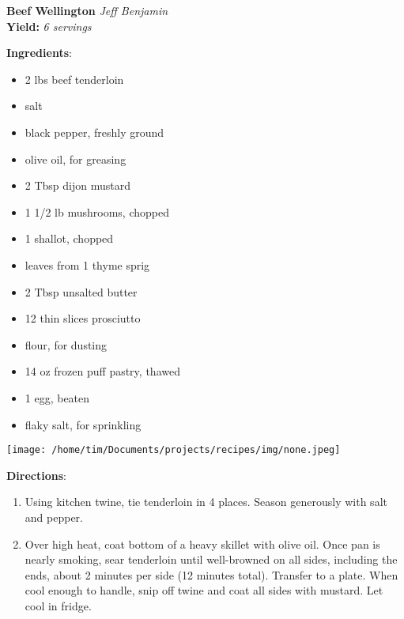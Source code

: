 \documentclass[11pt, twoside, openany]{book}
\begin{document}
\noindent\begin{minipage}[t]{\linewidth}%
{\Large\textbf{Beef Wellington}} \label{beef-wellington}\hfill\textit{Jeff Benjamin}\\
\textbf{Yield:} \textit{6 servings}\\
\noindent\begin{minipage}[t]{0.78\linewidth}%
\textbf{Ingredients}:\vspace{-3mm}
\begin{multicols}{2}
\begin{itemize}\setlength\itemsep{-1mm}
\item 2 lbs beef tenderloin
\item salt
\item black pepper, freshly ground
\item olive oil, for greasing
\item 2 Tbsp dijon mustard
\item 1 1/2 lb mushrooms, chopped
\item 1 shallot, chopped
\item leaves from 1 thyme sprig
\item 2 Tbsp unsalted butter
\item 12 thin slices prosciutto
\item flour, for dusting
\item 14 oz frozen puff pastry, thawed
\item 1 egg, beaten
\item flaky salt, for sprinkling
\end{itemize}
\end{multicols}
\end{minipage}
\noindent\begin{minipage}[t]{0.18\linewidth}
\centering \strut\vspace*{-\baselineskip}\newline
\texttt{[image: /home/tim/Documents/projects/recipes/img/none.jpeg]}\\
\end{minipage}\vspace{3mm}
\textbf{Directions}:
\vspace{-3mm}\begin{enumerate}\setlength\itemsep{-1mm}
\item Using kitchen twine, tie tenderloin in 4 places. Season generously with salt and pepper.
\item Over high heat, coat bottom of a heavy skillet with olive oil. Once pan is nearly smoking, sear tenderloin until well-browned on all sides, including the ends, about 2 minutes per side (12 minutes total). Transfer to a plate. When cool enough to handle, snip off twine and coat all sides with mustard. Let cool in fridge.

\end{enumerate}
\end{minipage}
\end{document}
